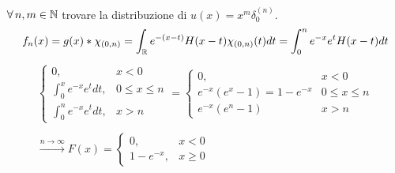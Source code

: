 $\forall n, m\in \NN $ trovare la distribuzione di $u(x) = x^{m} \delta^{(n)}_{0}$.
\Soluzione
\begin{equation*}
f_{n} (x) = g(x)*\chi_{(0, n)} = \int_{\mathbb{R}} e^{- (x - t)} H(x - t)\chi_{(0, n)} (t)dt = \int^{n}_{0} e^{- x} e^{t} H(x - t)dt
\end{equation*}
\begin{gather*}
\begin{cases}
0, & x < 0\\
\int^{x}_{0} e^{- x} e^{t} dt, & 0 \leq x \leq n\\
\int^{n}_{0} e^{- x} e^{t} dt, & x > n
\end{cases} = 
\begin{cases}
0, & x < 0\\
e^{- x}\left(e^{x} - 1\right) = 1 - e^{- x} & 0 \leq x \leq n\\
e^{- x} (e^{n} - 1) & x > n
\end{cases}\\
\\
\xrightarrow{n\rightarrow \infty} F(x) = 
\begin{cases}
0, & x < 0\\
1 - e^{- x}, & x \geq 0
\end{cases}
\end{gather*}
